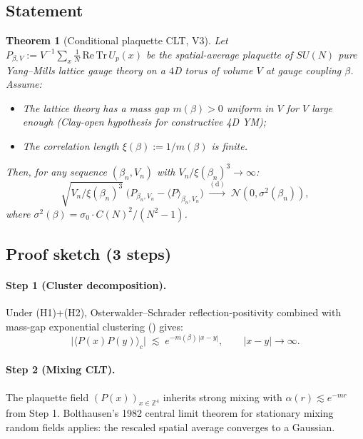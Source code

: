 \documentclass[11pt,a4paper,reqno]{amsart}
\newtheorem{theorem}{Theorem}[section]
\theoremstyle{definition}
\begin{document}
\subsection{Statement}

\begin{theorem}[Conditional plaquette CLT, V3]\label{thm:plaq-clt}
Let $P_{\beta,V} := V^{-1}\sum_x \tfrac{1}{N}\,\mathrm{Re}\,\mathrm{Tr}\,U_p(x)$ be the spatial-average
plaquette of $SU(N)$ pure Yang--Mills lattice gauge theory on a $4$D torus of volume $V$ at
gauge coupling $\beta$. Assume:
\begin{itemize}
\item[\textbf{(H1)}] The lattice theory has a mass gap $m(\beta) > 0$ uniform in $V$ for $V$ large
enough (\emph{Clay-open hypothesis for constructive 4D YM});
\item[\textbf{(H2)}] The correlation length $\xi(\beta) := 1/m(\beta)$ is finite.
\end{itemize}
Then, for any sequence $(\beta_n, V_n)$ with $V_n/\xi(\beta_n)^3 \to \infty$:
\[
\sqrt{V_n/\xi(\beta_n)^3}\;\bigl(P_{\beta_n,V_n} - \langle P\rangle_{\beta_n,V_n}\bigr)
\;\xrightarrow{\mathrm{(d)}}\; \mathcal{N}(0, \sigma^2(\beta_n)),
\]
where $\sigma^2(\beta) = \sigma_0 \cdot C(N)^2/(N^2-1)$.
\end{theorem}

\subsection{Proof sketch (3 steps)}

\paragraph{Step 1 (Cluster decomposition).} Under (H1)+(H2), Osterwalder--Schrader
reflection-positivity combined with mass-gap exponential clustering
(\cite[Ch.~4]{WeinbergQTF-I}) gives:
\[
\bigl|\langle P(x)P(y)\rangle_c\bigr| \;\lesssim\; e^{-m(\beta)\,|x-y|}, \qquad |x-y| \to \infty.
\]

\paragraph{Step 2 (Mixing CLT).} The plaquette field $(P(x))_{x \in \mathbb{Z}^4}$ inherits
strong mixing with $\alpha(r) \lesssim e^{-mr}$ from Step 1. Bolthausen's 1982 central limit
theorem for stationary mixing random fields \cite{Bolthausen1982} applies: the rescaled
spatial average converges to a Gaussian.
\end{document}

